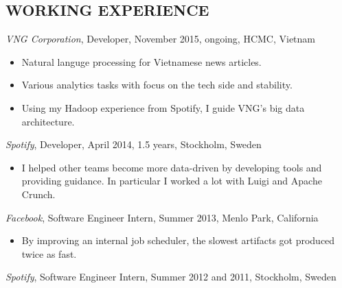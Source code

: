 \documentclass[11pt]{res} %
\begin{document}
\begin{resume}
\section{WORKING EXPERIENCE}
\emph{VNG Corporation}, {\footnotesize Developer, November 2015, ongoing}, HCMC, Vietnam
\vspace{0.2in}
   \begin{itemize}
     \item Natural languge processing for Vietnamese news articles.
     \item Various analytics tasks with focus on the tech side and stability.
     \item Using my Hadoop experience from Spotify, I guide VNG's big data architecture.
 \end{itemize}

\emph{Spotify}, {\footnotesize Developer, April 2014, 1.5 years}, Stockholm, Sweden
\vspace{0.2in}
   \begin{itemize}
     \item I helped other teams become more data-driven by developing tools and
     providing guidance.  In particular I worked a lot with Luigi and Apache
     Crunch.
 \end{itemize}

 \emph{Facebook}, {\footnotesize Software Engineer Intern, Summer 2013}, Menlo Park, California
\vspace{0.2in}
   \begin{itemize}
   \item By improving an internal job scheduler, the slowest artifacts got produced twice as fast.
 \end{itemize}

 \emph{Spotify}, {\footnotesize Software Engineer Intern, Summer 2012 and 2011}, Stockholm, Sweden



\end{resume}
\end{document}
